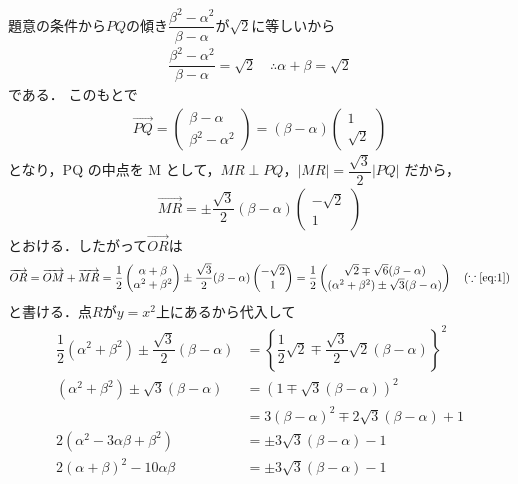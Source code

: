 \documentclass[../../main.tex]{subfiles}
\begin{document}
題意の条件から$PQ$の傾き$\dfrac{\beta^2-\alpha^2}{\beta-\alpha}$が$\sqrt{2}$に等しいから
\begin{align}
  \dfrac{\beta^2-\alpha^2}{\beta-\alpha} = \sqrt{2}
  \quad \therefore
  \alpha + \beta = \sqrt{2} \label{eq:1}
\end{align}
である．
このもとで
\begin{align}
  \overrightarrow{PQ} =
  \begin{pmatrix} \beta - \alpha \\ \beta^2 - \alpha^2
  \end{pmatrix} = (\beta - \alpha)
  \begin{pmatrix} 1 \\ \sqrt{2}
  \end{pmatrix} \label{eq:2}
\end{align}
となり，PQ の中点を M として，$MR \perp PQ$，$|MR| = \dfrac{\sqrt{3}}{2} |PQ|$ だから，
\begin{align}
  \overrightarrow{MR} = \pm \dfrac{\sqrt{3}}{2} (\beta - \alpha)
  \begin{pmatrix} -\sqrt{2} \\ 1
  \end{pmatrix} \label{eq:3}
\end{align}
とおける．したがって$\overrightarrow{OR}$は
\begin{align}
  \overrightarrow{OR}
  = \overrightarrow{OM}+\overrightarrow{MR}
  = \dfrac{1}{2}
  \begin{pmatrix} \alpha + \beta \\ \alpha^2 + \beta^2
  \end{pmatrix} \pm \dfrac{\sqrt{3}}{2} (\beta - \alpha)
  \begin{pmatrix} -\sqrt{2} \\ 1
  \end{pmatrix}
  = \dfrac{1}{2}
  \begin{pmatrix}
    \sqrt{2}  \mp \sqrt{6}(\beta - \alpha) \\
    (\alpha^2 + \beta^2) \pm \sqrt{3}(\beta - \alpha)
  \end{pmatrix} \quad (\because{\text{\cref{eq:1}}})
\end{align}
と書ける．点$R$が$y=x^2$上にあるから代入して
\begin{align}
  \dfrac{1}{2} (\alpha^2 + \beta^2) \pm \dfrac{\sqrt{3}}{2} (\beta - \alpha)
  & = \left\{ \dfrac{1}{2} \sqrt{2} \mp \dfrac{\sqrt{3}}{2} \sqrt{2} (\beta - \alpha) \right\}^2 \\
  (\alpha^2 + \beta^2) \pm \sqrt{3}(\beta - \alpha)
  &= (1 \mp \sqrt{3}(\beta - \alpha))^2 \\
  &= 3(\beta - \alpha)^2 \mp 2\sqrt{3}(\beta - \alpha) + 1 \\
  2(\alpha^2-3\alpha\beta+\beta^2)
  &= \pm 3\sqrt{3}(\beta - \alpha)-1 \\
  2(\alpha+\beta)^2-10\alpha\beta
  &= \pm 3\sqrt{3}(\beta - \alpha)-1 \label{eq:4}
\end{align}
\end{document}
